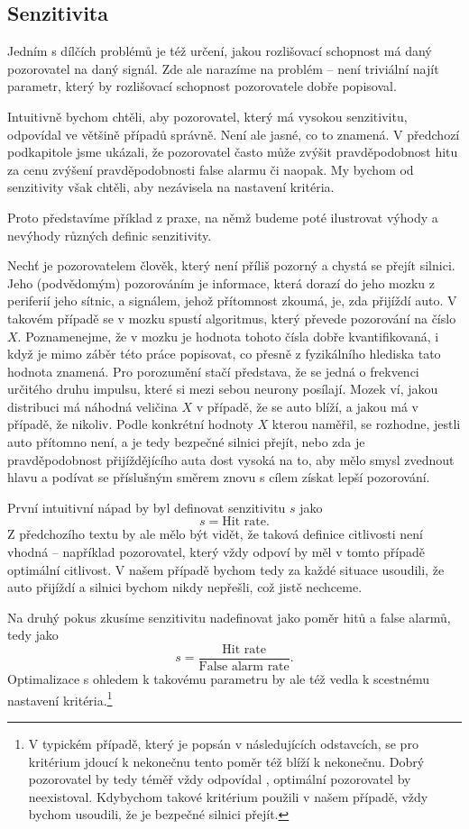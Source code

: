 \subsection{Senzitivita}

Jedním s dílčích problémů je též určení, jakou rozlišovací schopnost má daný
pozorovatel na daný signál. Zde ale narazíme na problém -- není triviální
najít parametr, který by rozlišovací schopnost pozorovatele dobře popisoval.

Intuitivně bychom chtěli, aby pozorovatel, který má vysokou senzitivitu,
odpovídal ve většině případů správně. Není ale jasné, co to znamená. V předchozí
podkapitole jsme ukázali, že pozorovatel často může zvýšit pravděpodobnost
hitu za cenu zvýšení pravděpodobnosti false alarmu či naopak. My bychom od senzitivity
však chtěli, aby nezávisela na nastavení kritéria.

Proto představíme příklad z praxe, na němž budeme poté ilustrovat výhody a 
nevýhody různých definic senzitivity.

Nechť je pozorovatelem člověk, který není
příliš pozorný a chystá se přejít silnici. Jeho (podvědomým) pozorováním je
informace, která dorazí do jeho mozku z periferií jeho sítnic, a signálem, jehož
přítomnost zkoumá, je, zda přijíždí auto. V takovém případě se v mozku spustí
algoritmus, který převede pozorování na číslo $X$. Poznamenejme, že v mozku je
hodnota tohoto čísla dobře kvantifikovaná, i když je mimo záběr této práce
popisovat, co přesně z fyzikálního hlediska tato hodnota znamená. Pro
porozumění stačí představa, že se jedná o frekvenci určitého druhu impulsu,
které si mezi sebou neurony posílají. Mozek ví, jakou distribuci má náhodná
veličina $X$ v případě, že se auto blíží, a jakou má v případě, že nikoliv.
Podle konkrétní hodnoty $X$ kterou naměřil, se rozhodne, jestli auto přítomno
není, a je tedy bezpečné silnici přejít, nebo zda je pravděpodobnost
přijíždějícího auta dost vysoká na to, aby mělo smysl zvednout hlavu a podívat
se příslušným směrem znovu s cílem získat lepší pozorování.

První intuitivní nápad by byl definovat senzitivitu $s$ jako $$s=\text{Hit rate}.$$
Z předchozího textu by ale mělo být vidět, že
taková definice citlivosti není vhodná -- například pozorovatel, který vždy odpoví
 by měl v tomto případě optimální citlivost. V našem případě bychom tedy za každé situace usoudili, že auto přijíždí a silnici bychom nikdy nepřešli, což jistě nechceme.

Na druhý pokus zkusíme senzitivitu nadefinovat jako poměr hitů a false alarmů,
tedy jako $$s=\frac{\text{Hit rate}}{\text{False alarm rate}}.$$
Optimalizace s ohledem k takovému parametru by ale též vedla k scestnému nastavení
kritéria.\footnote{V typickém případě, který je popsán v následujících
odstavcích, se pro kritérium jdoucí k nekonečnu tento poměr též blíží k
nekonečnu. Dobrý pozorovatel by tedy téměř vždy odpovídal , optimální
pozorovatel by neexistoval. Kdybychom takové kritérium použili v našem případě, vždy bychom usoudili, že je bezpečné silnici přejít.}

